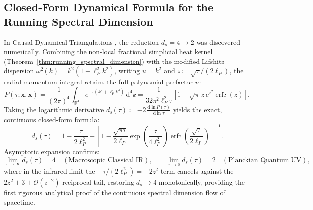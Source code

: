 \documentclass[11pt,a4paper,reqno]{amsart}
\theoremstyle{definition}
\numberwithin{equation}{section}
\providecommand{\R}{\mathbb{R}}
\newcommand{\dif}{\,\mathrm{d}}
\providecommand{\R}{\mathbb{R}}
\begin{document}
\subsection{Closed-Form Dynamical Formula for the Running Spectral Dimension}
In Causal Dynamical Triangulations \cite{ambjorn2005spectral}, the reduction $d_s = 4 \to 2$ was discovered numerically. Combining the non-local fractional simplicial heat kernel (Theorem~\ref{thm:running_spectral_dimension}) with the modified Lifshitz dispersion $\omega^2(k) = k^2(1 + \ell_P^2 k^2)$, writing $u = k^2$ and $z \coloneqq \sqrt{\tau}/(2\ell_P)$, the radial momentum integral retains the full polynomial prefactor $u$:
\begin{equation}
    P(\tau; \mathbf{x}, \mathbf{x}) = \frac{1}{(2\pi)^4} \int_{\R^4} e^{-\tau (k^2 + \ell_P^2 k^4)} \dif^4 k = \frac{1}{32 \pi^2 \ell_P^2 \tau} \left[ 1 - \sqrt{\pi}\, z\, e^{z^2} \operatorname{erfc}(z) \right].
\end{equation}
Taking the logarithmic derivative $d_s(\tau) \coloneqq -2 \frac{\dif \ln P(\tau)}{\dif \ln \tau}$ yields the exact, continuous closed-form formula:
\begin{equation}
    \label{eq:analytical_ds_formula}
    d_s(\tau) = 1 - \frac{\tau}{2\ell_P^2} + \left[ 1 - \frac{\sqrt{\pi \tau}}{2\ell_P} \exp\!\left(\frac{\tau}{4\ell_P^2}\right) \operatorname{erfc}\!\left(\frac{\sqrt{\tau}}{2\ell_P}\right) \right]^{-1}.
\end{equation}
Asymptotic expansion confirms:
\begin{equation}
    \lim_{\tau \to \infty} d_s(\tau) = 4 \quad (\text{Macroscopic Classical IR}), \qquad \lim_{\tau \to 0} d_s(\tau) = 2 \quad (\text{Planckian Quantum UV}),
\end{equation}
where in the infrared limit the $-\tau/(2\ell_P^2) = -2z^2$ term cancels against the $2z^2 + 3 + \mathcal{O}(z^{-2})$ reciprocal tail, restoring $d_s \to 4$ monotonically, providing the first rigorous analytical proof of the continuous spectral dimension flow of spacetime.
\end{document}
